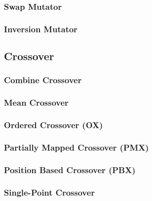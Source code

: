     \subsubsection{Swap Mutator}
    \label{sec:keen:operators:mutation:swap}
      \Blindtext
    \subsubsection{Inversion Mutator}
    \label{sec:keen:operators:mutation:inversion}
      \Blindtext
  \subsection{Crossover}
  \label{sec:keen:operators:crossover}
    \subsubsection{Combine Crossover}
    \label{sec:keen:operators:crossover:combine}
      \Blindtext
    \subsubsection{Mean Crossover}
    \label{sec:keen:operators:crossover:mean}
      \Blindtext
    \subsubsection{Ordered Crossover (OX)}
    \label{sec:keen:operators:crossover:ordered}
      \Blindtext
    \subsubsection{Partially Mapped Crossover (PMX)}
    \label{sec:keen:operators:crossover:partially_mapped}
      \Blindtext
    \subsubsection{Position Based Crossover (PBX)}
    \label{sec:keen:operators:crossover:position_based}
      \Blindtext
    \subsubsection{Single-Point Crossover}
    \label{sec:keen:operators:crossover:single_point}
      \Blindtext
